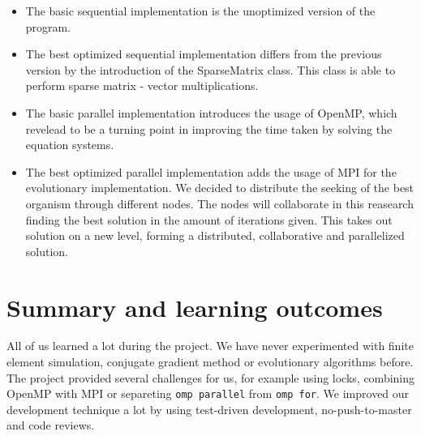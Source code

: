 \documentclass[12pt]{article}
\begin{document}
\begin{itemize}
    \item The basic sequential implementation is the unoptimized version of the program.
    \item The best optimized sequential implementation differs from the previous version by the introduction of the SparseMatrix class. This class is able to perform sparse matrix - vector multiplications.
    \item The basic parallel implementation introduces the usage of OpenMP, which revelead to be a turning point in improving the time taken by solving the equation systems.
    \item The best optimized parallel implementation adds the usage of MPI for the evolutionary implementation. We decided to distribute the seeking of the best organism through different nodes. The nodes will collaborate in this reasearch finding the best solution in the amount of iterations given. This takes out solution on a new level, forming a distributed, collaborative and parallelized solution.
\end{itemize}

\section{Summary and learning outcomes}
All of us learned a lot during the project. We have never experimented with finite element simulation, conjugate gradient method or evolutionary algorithms before. The project provided several challenges for us, for example using locks, combining OpenMP with MPI or separeting \texttt{omp parallel} from \texttt{omp for}. We improved our development technique a lot by using test-driven development, no-push-to-master and code reviews.



\end{document}
